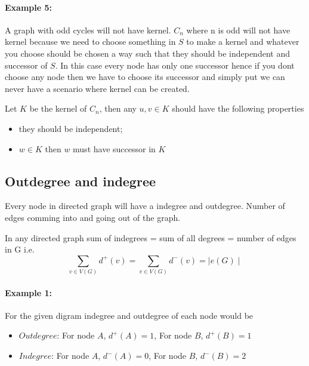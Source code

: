 \paragraph{Example 5:}A graph with odd cycles will not have kernel. $ C_n$ where n is odd will not have kernel because we need to choose something in $ S $ to make a kernel and whatever you choose should be chosen a way such that they should be independent and successor of $ S $. In this case every node has only one successor hence if you dont choose any node then we have to choose its successor and simply put we can never have a scenario where kernel can be created.

Let $ K $ be the kernel of $C_n$, then any $u,v \in K$ should have the following properties 

\begin{itemize}
    \item they should be independent;
    \item $ w \in K$ then $w$ must have successor in $K$
    \end{itemize}

\subsection{Outdegree and indegree}

Every node in directed graph will have a indegree and outdegree. Number of edges comming into and going out of the graph. 

In any directed graph sum of indegrees = sum of all degrees = number of edges in G i.e. \begin{equation}
    {\textstyle \sum_{v \in V(G)}} d^+(v) = {\textstyle \sum_{v \in V(G)}}  d^-(v) = {\textstyle \mid e(G) \mid}
 \end{equation}

\paragraph{Example 1:}For the given digram indegree and outdegree of each node would be\begin{itemize}
    \item $Outdegree$: For node $A$, $d^+(A) = 1$, For node $B$, $d^+(B) = 1$ 
    \item $Indegree$: For node $A$, $d^-(A) = 0$, For node $B$, $d^-(B) = 2$ 
    \end{itemize}

